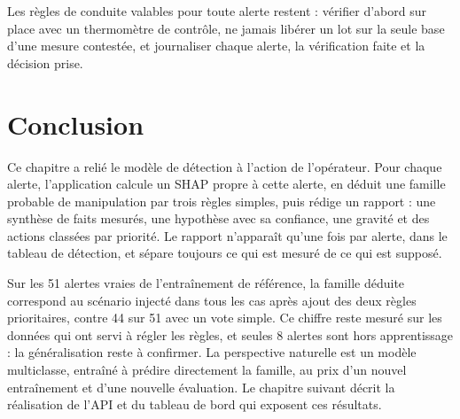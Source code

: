Les règles de conduite valables pour toute alerte restent : vérifier d'abord
sur place avec un thermomètre de contrôle, ne jamais libérer un lot sur la seule
base d'une mesure contestée, et journaliser chaque alerte, la vérification
faite et la décision prise.


\section{Conclusion}

Ce chapitre a relié le modèle de détection à l'action de l'opérateur. Pour
chaque alerte, l'application calcule un SHAP propre à cette alerte, en déduit
une famille probable de manipulation par trois règles simples, puis rédige un
rapport : une synthèse de faits mesurés, une hypothèse avec sa confiance, une
gravité et des actions classées par priorité. Le rapport n'apparaît qu'une
fois par alerte, dans le tableau de détection, et sépare toujours ce qui est
mesuré de ce qui est supposé.

Sur les 51 alertes vraies de l'entraînement de référence, la famille déduite
correspond au scénario injecté dans tous les cas après ajout des deux règles
prioritaires, contre 44 sur 51 avec un vote simple. Ce chiffre reste mesuré sur
les données qui ont servi à régler les règles, et seules 8 alertes sont hors
apprentissage : la généralisation reste à confirmer. La perspective naturelle
est un modèle multiclasse, entraîné à prédire directement la famille, au prix
d'un nouvel entraînement et d'une nouvelle évaluation. Le chapitre suivant
décrit la réalisation de l'API et du tableau de bord qui exposent ces
résultats.
